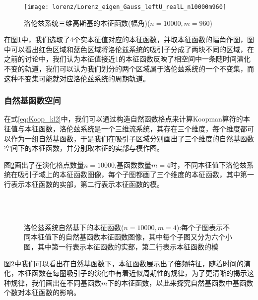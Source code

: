 \begin{figure}
	\centering
	\texttt{[image: lorenz/Lorenz\_eigen\_Gauss\_leftU\_realL\_n10000m960]}
    \caption{洛伦兹系统三维高斯基的本征函数(幅角)($n=10000,m=960$)}\label{fig:lorenz_eig_gauss_angle}
\end{figure}

在图\ref{fig:lorenz_eig_gauss_angle}中，我们选取了4个实本征值对应的本征函数，并取本征函数的幅角作图，图中可以看出红色区域和蓝色区域将洛伦兹系统的吸引子分成了两块不同的区域，在之前的讨论中，我们认为本征值接近1的本征函数反映了相空间中一条随时间演化不变的轨道，我们可以认为我们划分的两个区域属于洛伦兹系统的一个不变集，而这种不变集可能就对应洛伦兹系统的周期轨道。

\subsubsection{自然基函数空间}
在式\eqref{eq:Koop_kl2}中，我们可以通过构造自然函数格点来计算Koopman算符的本征值与本征函数，洛伦兹系统是一个三维流系统，其存在三个维度，每个维度都可以作为一组自然基函数，于是我们在吸引子区域分别画出了三个维度的自然基函数空间下的本征函数，并分别取本征的实部与模作图。

图\ref{fig:lorenz_eig_natural}画出了在演化格点数量$n=10000$,基函数数量$m=4$时，不同本征值下洛伦兹系统在吸引子域上的本征函数图像，每个子图都画了三个维度的本征函数，其中第一行表示本征函数的实部，第二行表示本征函数的模。
\begin{figure}
    \centering
    \\
    \\
    \caption{洛伦兹系统自然基下的本征函数($n=10000,m=4$):每个子图表示不同本征值下的自然基函数本征函数图像，其中每个子图又分为六个小图，其中第一行表示本征函数的实部，第二行表示本征函数的模}\label{fig:lorenz_eig_natural}
\end{figure}

图\ref{fig:lorenz_eig_natural}中我们可以看出在自然基函数下，本征函数展示出了倍频特征，随着时间的演化，本征函数在每圈吸引子的演化中有着近似周期性的规律，为了更清晰的揭示这种规律，我们画出在不同基函数$m$下的本征函数，以此来探究自然基函数中基函数个数对本征函数的影响。

